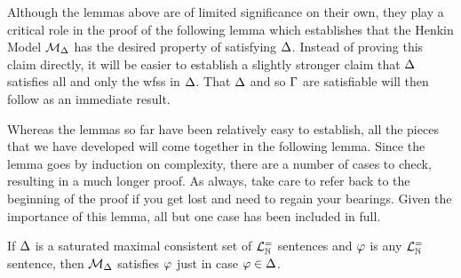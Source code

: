 Although the lemmas above are of limited significance on their own, they play a critical role in the proof of the following lemma which establishes that the Henkin Model $\mathcal{M}_{\Delta}$ has the desired property of satisfying $\Delta$. 
Instead of proving this claim directly, it will be easier to establish a slightly stronger claim that $\Delta$ satisfies all and only the wfss in $\Delta$. 
That $\Delta$ and so $\Gamma$ are satisfiable will then follow as an immediate result.

Whereas the lemmas so far have been relatively easy to establish, all the pieces that we have developed will come together in the following lemma.
Since the lemma goes by induction on complexity, there are a number of cases to check, resulting in a much longer proof.
As always, take care to refer back to the beginning of the proof if you get lost and need to regain your bearings.
Given the importance of this lemma, all but one case has been included in full.

\begin{Lthm} \label{lemma:FOL-truth}
  If $\Delta$ is a saturated maximal consistent set of $\mathcal{L}^{=}_{\mathbb{N}}$ sentences and $\varphi$ is any $\mathcal{L}^{=}_{\mathbb{N}}$ sentence, then $\mathcal{M}_{\Delta}$ satisfies $\varphi$ just in case $\varphi\in\Delta$.  
\end{Lthm}

